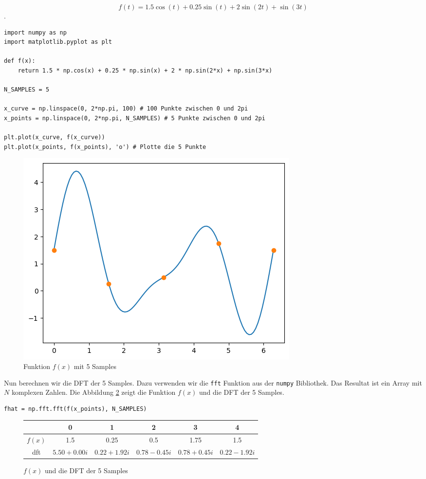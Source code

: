 \documentclass[11pt,a4paper]{article}
\begin{document}
\[ f(t) = 1.5 \cos(t) + 0.25 \sin(t) + 2 \sin(2t) + \sin(3t) \].


\begin{lstlisting}
import numpy as np
import matplotlib.pyplot as plt

def f(x):
    return 1.5 * np.cos(x) + 0.25 * np.sin(x) + 2 * np.sin(2*x) + np.sin(3*x)

N_SAMPLES = 5

x_curve = np.linspace(0, 2*np.pi, 100) # 100 Punkte zwischen 0 und 2pi
x_points = np.linspace(0, 2*np.pi, N_SAMPLES) # 5 Punkte zwischen 0 und 2pi

plt.plot(x_curve, f(x_curve))
plt.plot(x_points, f(x_points), 'o') # Plotte die 5 Punkte
\end{lstlisting}

\begin{figure}[h]
    \centering
    \includegraphics[width=0.60\linewidth]{img/dft.png}
    \caption{Funktion \( f(x) \) mit 5 Samples}
    \label{fig:dft_example}
\end{figure}

\noindent
Nun berechnen wir die DFT der 5 Samples. Dazu verwenden wir die \texttt{fft} Funktion aus der
\texttt{numpy} Bibliothek. Das Resultat ist ein Array mit \(N\) komplexen Zahlen. Die Abbildung 
\ref{fig:dft_example_table} zeigt die Funktion \(f(x)\) und die DFT der 5 Samples.

\begin{lstlisting}
fhat = np.fft.fft(f(x_points), N_SAMPLES)
\end{lstlisting}

\begin{figure}[h]
    \centering
    \begin{tabular}{|c|c|c|c|c|c|}
    \hline
    & 0 & 1 & 2 & 3 & 4 \\
    \hline
    \(f(x)\) & 1.5 & 0.25 & 0.5 & 1.75 & 1.5 \\
    \hline
    dft & \(5.50 + 0.00i\) & \(0.22 + 1.92i\) & \(0.78 - 0.45i\) & \(0.78 + 0.45i\) & \(0.22 - 1.92i\) \\
    \hline
    \end{tabular}
    \caption{\(f(x)\) und die DFT der 5 Samples}
    \label{fig:dft_example_table}
\end{figure}
\end{document}
